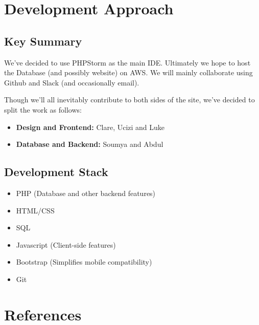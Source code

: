 \documentclass[12pt]{article}
\begin{document}
\section{Development Approach}

\subsection{Key Summary}
We've decided to use PHPStorm as the main IDE. Ultimately we hope to host the
Database (and possibly website) on AWS. We will mainly collaborate using
Github and Slack (and occasionally email).

Though we'll all inevitably contribute to both sides of the site, we've
decided to split the work as follows:
\begin{itemize}
    \item \textbf{Design and Frontend:} Clare, Ucizi and Luke
    \item \textbf{Database and Backend:} Soumya and Abdul
\end{itemize}

\subsection{Development Stack}
\begin{itemize}
    \item PHP (Database and other backend features)
    \item HTML/CSS
    \item SQL
    \item Javascript (Client-side features)
    \item Bootstrap (Simplifies mobile compatibility)
    \item Git
\end{itemize}


\section{References}
\end{document}
